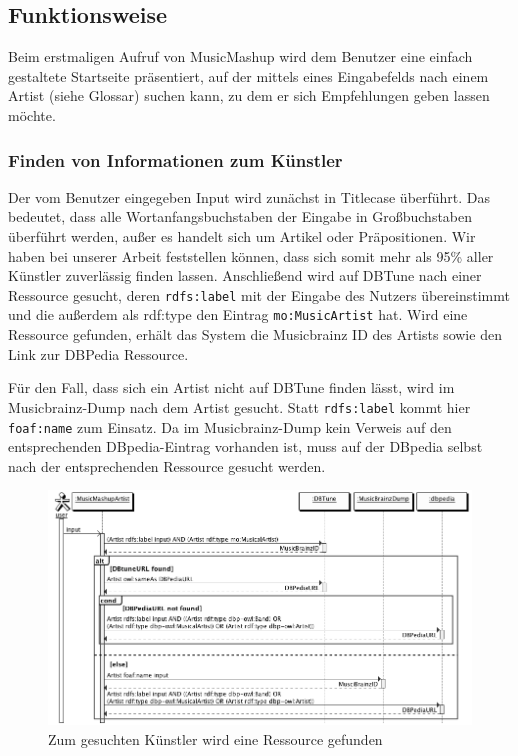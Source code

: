 \subsection{Funktionsweise}


Beim erstmaligen Aufruf von MusicMashup wird dem Benutzer eine einfach gestaltete Startseite präsentiert, auf der mittels eines Eingabefelds nach einem Artist (siehe Glossar) suchen kann, zu dem er sich Empfehlungen geben lassen möchte.



\subsubsection{Finden von Informationen zum Künstler}
Der vom Benutzer eingegeben Input wird zunächst in Titlecase überführt. Das bedeutet, dass alle Wortanfangsbuchstaben der Eingabe in Großbuchstaben überführt werden, außer es handelt sich um Artikel oder Präpositionen. Wir haben bei unserer Arbeit feststellen können, dass sich somit mehr als 95\% aller Künstler zuverlässig finden lassen.
Anschließend wird auf DBTune nach einer Ressource gesucht, deren \texttt{rdfs:label} mit der Eingabe des Nutzers übereinstimmt und die außerdem als rdf:type den Eintrag \texttt{mo:MusicArtist} hat. Wird eine Ressource gefunden, erhält das System die Musicbrainz ID des Artists sowie den Link zur DBPedia Ressource.

Für den Fall, dass sich ein Artist nicht auf DBTune finden lässt, wird im Musicbrainz-Dump nach dem Artist gesucht. Statt \texttt{rdfs:label} kommt hier \texttt{foaf:name} zum Einsatz. Da im Musicbrainz-Dump kein Verweis auf den entsprechenden DBpedia-Eintrag vorhanden ist, muss auf der DBpedia selbst nach der entsprechenden Ressource gesucht werden.

\begin{figure}[ht!]
\centering
\includegraphics[width=137mm]{bilder/sequenzdiagramm.png}
\caption{Zum gesuchten Künstler wird eine Ressource gefunden \label{overflow}}
\end{figure}


